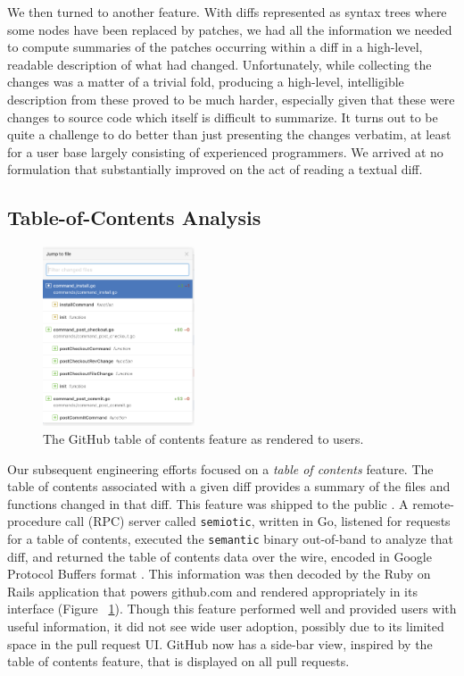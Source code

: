 \documentclass[acmsmall,fleqn,12pt]{acmart}
\begin{document}
We then turned to another feature. With diffs represented as syntax trees where
some nodes have been replaced by patches, we had all the information we needed
to compute summaries of the patches occurring within a diff in a high-level,
readable description of what had changed. Unfortunately, while collecting the
changes was a matter of a trivial fold, producing a high-level, intelligible
description from these proved to be much harder, especially given that these
were changes to source code which itself is difficult to summarize. It turns out
to be quite a challenge to do better than just presenting the changes verbatim,
at least for a user base largely consisting of experienced programmers. We arrived
at no formulation that substantially improved on the act of reading a textual diff.

\subsection{Table-of-Contents Analysis}

\begin{figure}
  \begin{center}
    \includegraphics[width=0.4\textwidth]{table-of-contents-screenshot.png}
  \end{center}
  \caption{The GitHub table of contents feature as rendered to users.}
  \label{fig:TOCScreenshot}
\end{figure}

Our subsequent engineering efforts focused on a \textit{table of contents}
feature. The table of contents associated with a given diff provides a summary
of the files and functions changed in that diff. This feature was shipped to the
public \cite{rix17changed}. A remote-procedure call (RPC) server called
\texttt{semiotic}, written in Go, listened for requests for a table of contents,
executed the \texttt{semantic} binary out-of-band to analyze that diff, and
returned the table of contents data over the wire, encoded in Google Protocol
Buffers format \cite{google08protocol}. This information was then decoded by the
Ruby on Rails application that powers \textsf{github.com} and rendered
appropriately in its interface (Figure ~\ref{fig:TOCScreenshot}).
Though this feature performed well and provided users with useful information,
it did not see wide user adoption, possibly due to its limited space in the pull
request UI. GitHub now has a side-bar view, inspired by the table of contents
feature, that is displayed on all pull requests.
\end{document}
